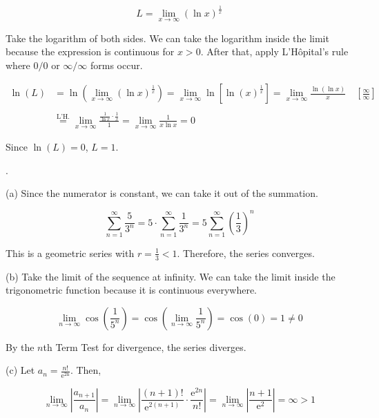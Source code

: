 \documentclass{article}
\begin{document}
\[L=\lim_{x\to\infty}(\ln x)^{\textstyle\frac1x}\]

\hfill

\noindent Take the logarithm of both sides. We can take the logarithm inside the limit because the expression is continuous for $x>0$. After that, apply L'Hôpital's rule where $0/0$ or $\infty/\infty$ forms occur.

\begin{align*}
\ln(L)&=\ln\left(\lim_{x\to\infty}(\ln x)^{\textstyle\frac1x}\right)=\lim_{x\to\infty}\ln\left[\ln(x)^{\textstyle\frac1x}\right]=\lim_{x\to\infty}\frac{\ln(\ln x)}x\quad\left[\frac\infty\infty\right]\\\\&\overset{\text{L'H.}}{=}\lim_{x\to\infty}\frac{\displaystyle\frac1{\ln x}\cdot\frac1x}1=\lim_{x\to\infty}\frac1{x\ln x}=0
\end{align*}

\hfill

\noindent Since $\ln(L)=0$, $\boxed{L=1}$.

\newpage

.

\hfill

\noindent (a) Since the numerator is constant, we can take it out of the summation.

\[\sum_{n=1}^\infty\frac5{3^n}=5\cdot\sum_{n=1}^\infty\frac1{3^n}=5\sum_{n=1}^\infty\left(\frac13\right)^n\]

\hfill

\noindent This is a geometric series with $\displaystyle r=\frac13<1$. Therefore, the series converges.

\hfill

\noindent (b) Take the limit of the sequence at infinity. We can take the limit inside the trigonometric function because it is continuous everywhere.

\[\lim_{n\to\infty}\cos\left(\frac1{5^n}\right)=\cos\left(\lim_{n\to\infty}\frac1{5^n}\right)=\cos(0)=1\neq0\]

\hfill

\noindent By the $n$th Term Test for divergence, the series diverges.

\hfill

\noindent (c) Let $\displaystyle a_n=\frac{n!}{\mathrm{e^{2n}}}$. Then,

\[\lim_{n\to\infty}\left|\frac{a_{n+1}}{a_n}\right|=\lim_{n\to\infty}\left|\frac{(n+1)!}{\mathrm{e}^{2(n+1)}}\cdot\frac{\mathrm{e}^{2n}}{n!}\right|=\lim_{n\to\infty}\left|\frac{n+1}{\mathrm{e}^2}\right|=\infty>1\]
\end{document}

